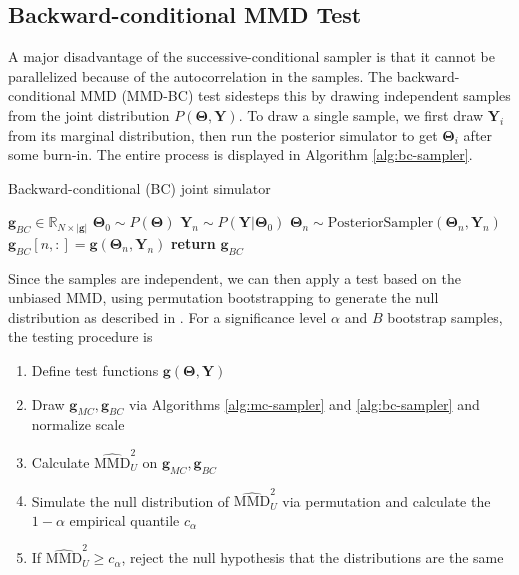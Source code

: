 \documentclass[a4paper,11pt]{article}
\begin{document}
\subsection{Backward-conditional MMD Test}
A major disadvantage of the successive-conditional sampler is that it cannot be parallelized because of the autocorrelation in the samples. The backward-conditional MMD (MMD-BC) test sidesteps this by drawing independent samples from the joint distribution $P(\mathbf{\Theta}, \mathbf{Y})$. To draw a single sample, we first draw $\mathbf{Y}_{i}$ from its marginal distribution, then run the posterior simulator to get $\mathbf{\Theta}_{i}$ after some burn-in. The entire process is displayed in Algorithm \ref{alg:bc-sampler}. 

\begin{algorithm}[H]
    \centering
    \caption{Backward-conditional (BC) joint simulator}\label{alg:bc-sampler}
    \begin{algorithmic}[1]
        \State {} $\mathbf{g}_{BC} \in \mathbb{R}_{N\times |\mathbf{g}|}$
            \State $\mathbf{\Theta}_{0} \sim P(\mathbf{\Theta})$ 
            \State $\mathbf{Y}_{n} \sim P(\mathbf{Y}|\mathbf{\Theta}_{0})$ 
                \State $\mathbf{\Theta}_{n} \sim \text{PosteriorSampler}(\mathbf{\Theta}_{n}, \mathbf{Y}_{n})$
            \EndFor
            \State $\mathbf{g}_{BC}[n, :] = \mathbf{g}(\mathbf{\Theta}_{n}, \mathbf{Y}_{n})$ 
        \EndFor        
        \State \textbf{return} $\mathbf{g}_{BC}$
    \end{algorithmic}
\end{algorithm}

Since the samples are independent, we can then apply a test based on the unbiased MMD, using permutation bootstrapping to generate the null distribution as described in \cite{gretton_kernel_2012}. For a significance level $\alpha$ and $B$ bootstrap samples, the testing procedure is
\begin{enumerate}
    \item Define test functions $\mathbf{g}(\mathbf{\Theta}, \mathbf{Y})$
    \item Draw $\mathbf{g}_{MC}, \mathbf{g}_{BC}$ via Algorithms \ref{alg:mc-sampler} and \ref{alg:bc-sampler} and normalize scale
    \item Calculate $\widehat{\mathrm{MMD}}_{U}^{2}$ on $\mathbf{g}_{MC}, \mathbf{g}_{BC}$
    \item Simulate the null distribution of $\widehat{\mathrm{MMD}}_{U}^{2}$ via permutation and calculate the $1-\alpha$ empirical quantile $c_{\alpha}$
    \item If $\widehat{\mathrm{MMD}}_{U}^{2} \geq c_{\alpha}$, reject the null hypothesis that the distributions are the same
\end{enumerate}
\end{document}
